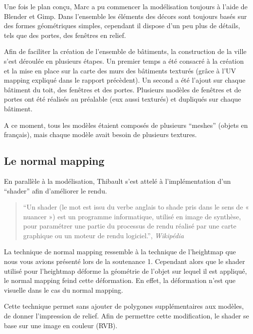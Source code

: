 \documentclass[11pt]{report}
\begin{document}
Une fois le plan conçu, Marc a pu commencer la modélisation toujours à l’aide de Blender et Gimp.
Dans l’ensemble les éléments des décors sont toujours basés sur des formes géométriques simples, cependant il dispose d’un peu plus de détails, tels que des portes, des fenêtres en relief.

Afin de faciliter la création de l’ensemble de bâtiments, la construction de la ville s’est déroulée en plusieurs étapes. Un premier temps a été consacré à la création et la mise en place sur la carte des murs des bâtiments texturés (grâce à l’UV mapping expliqué dans le rapport précèdent). Un second a été l’ajout sur chaque bâtiment du toit, des fenêtres et des portes. Plusieurs modèles de fenêtres et de portes ont été réalisés au préalable (eux aussi texturés) et dupliqués sur chaque bâtiment.

A ce moment, tous les modèles étaient composés de plusieurs ``meshes'' (objets en français), mais  chaque modèle avait besoin de plusieurs textures.

\subsection{Le normal mapping}

En parallèle à la modélisation, Thibault s’est attelé à l’implémentation d’un ``shader'' afin d’améliorer le rendu.

\begin{quote}
``Un shader (le mot est issu du verbe anglais to shade pris dans le sens de « nuancer ») est un programme informatique, utilisé en image de synthèse, pour paramétrer une partie du processus de rendu réalisé par une carte graphique ou un moteur de rendu logiciel.'', \emph{Wikipédia}
\end{quote}

La technique de normal mapping ressemble à la technique de l’heightmap que nous vous avions présenté lors de la soutenance 1. Cependant alors que le shader utilisé pour l’heightmap déforme la géométrie de l’objet sur lequel il est appliqué, le normal mapping feind cette déformation. En effet, la déformation n’est que visuelle dans le cas du normal mapping.

Cette technique permet sans ajouter de polygones supplémentaires aux modèles, de donner l’impression de relief. Afin de permettre cette modification, le shader se base sur une image en couleur (RVB).
\end{document}
